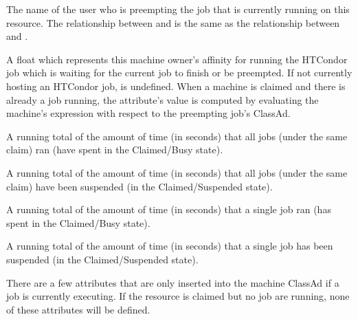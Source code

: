\begin{description}
\item[\AdAttr{PreemptingUser}:] The name of the user who is preempting
the job that is currently running on this resource.  The relationship
between  and  is the same
as the relationship between  and .

\item[\AdAttr{PreemptingRank}:] A float which represents this machine
owner's affinity for running the HTCondor job which is waiting for the
current job to finish or be preempted.  If not currently hosting an
HTCondor job,  is undefined.  When a machine is
claimed and there is already a job running, the attribute's value is
computed by evaluating the machine's  expression with
respect to the preempting job's ClassAd.

\item[\AdAttr{TotalClaimRunTime}:] A running total of the amount of
time (in seconds) that all jobs (under the same claim) ran
(have spent in the Claimed/Busy state).


\item[\AdAttr{TotalClaimSuspendTime}:] A running total of the amount of
time (in seconds) that all jobs (under the same claim) have been
suspended (in the Claimed/Suspended state).

\item[\AdAttr{TotalJobRunTime}:] A running total of the amount of
time (in seconds) that a single job ran
(has spent in the Claimed/Busy state).

\item[\AdAttr{TotalJobSuspendTime}:] A running total of the amount of
time (in seconds) that a single job has been suspended
(in the Claimed/Suspended state).

\end{description}

There are a few attributes that are only inserted into the
machine ClassAd if a job is currently executing.  
If the resource is claimed but no job are running, none of these
attributes will be defined.

